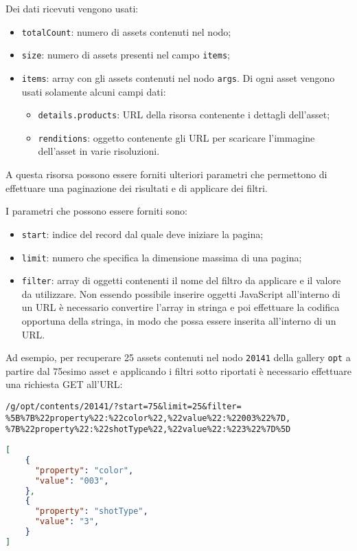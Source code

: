 Dei dati ricevuti vengono usati:
\begin{itemize}
\item \texttt{totalCount}: numero di assets contenuti nel nodo;
\item \texttt{size}: numero di assets presenti nel campo \texttt{items};
\item \texttt{items}: array con gli assets contenuti nel nodo \texttt{args}. Di ogni asset vengono usati solamente alcuni campi dati:
	\begin{itemize}
	\item \texttt{details.products}: URL della risorsa contenente i dettagli dell'asset;
	\item \texttt{renditions}: oggetto contenente gli URL per scaricare l'immagine dell'asset in varie risoluzioni.
	\end{itemize}
\end{itemize}

A questa risorsa possono essere forniti ulteriori parametri che permettono di effettuare una paginazione dei risultati e di applicare dei filtri.

I parametri che possono essere forniti sono:
\begin{itemize}
\item \texttt{start}: indice del record dal quale deve iniziare la pagina;
\item \texttt{limit}: numero che specifica la dimensione massima di una pagina;
\item \texttt{filter}: array di oggetti contenenti il nome del filtro da applicare e il valore da utilizzare. Non essendo possibile inserire oggetti JavaScript all'interno di un URL è necessario convertire l'array in stringa e poi effettuare la codifica opportuna della stringa, in modo che possa essere inserita all'interno di un URL.
\end{itemize}

Ad esempio, per recuperare 25 assets contenuti nel nodo \texttt{20141} della gallery \texttt{opt} a partire dal 75esimo asset e applicando i filtri sotto riportati è necessario effettuare una richiesta GET all'URL:

\begin{center}
\texttt{/g/opt/contents/20141/?start=75\&limit=25\&filter= \%5B\%7B\%22property\%22:\%22color\%22,\%22value\%22:\%22003\%22\%7D, \%7B\%22property\%22:\%22shotType\%22,\%22value\%22:\%223\%22\%7D\%5D}
\end{center}

\begin{lstlisting}[language=JSON, caption=Esempio dell'array da utilizzare per applicare dei filtri alla risorsa /g/{galleryCode}/contents/{args}, label=lst:filters]
[
	{
	  "property": "color",
	  "value": "003",
	},
	{
	  "property": "shotType",
	  "value": "3",
	}
]
\end{lstlisting}
\FloatBarrier

